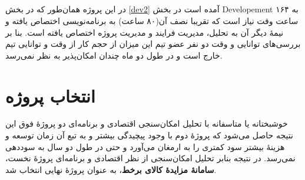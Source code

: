 \documentclass{article}
\begin{document}
\subsection{}


در این پروژه همان‌طور که در بخش \ref{dev2} آمده است در بخش Developement به ۱۶۴ ساعت وقت نیاز است که تقریبا نصف آن(۸۰ ساعت) به برنامه‌نویسی اختصاص یافته و نیمهٔ دیگر آن به تحلیل، مدیریت فرایند و مدیریت پروژه اختصاص یافته است. بنا بر بررسی‌های توانایی و وقت دو نفر عضو تیم این میزان از حجم کار از وقت و توانایی تیم خارج است و در طول دو ماه چندان امکان‌پذیر به نظر نمی‌رسد.


\section{انتخاب پروژه}

خوشبختانه یا متاسفانه با تحلیل امکان‌سنجی اقتصادی و برنامه‌ای دو پروژهٔ فوق این نتیجه حاصل می‌شود که پروژهٔ دوم با وجود پیچیدگی بیشتر و به تبع آن زمان توسعه و هزینهٔ بیشتر سود کمتری را به ارمغان می‌آورد و حتی در طول دو سال به سوددهی نمی‌رسد. در نتیجه بنابر تحلیل امکان‌سنجی از نظر اقتصادی و برنامه‌ای پروژهٔ نخست، \textbf{سامانهٔ مزایدهٔ کالای برخط}، به عنوان پروژهٔ نهایی انتخاب شد.
\end{document}
